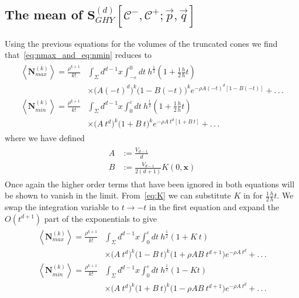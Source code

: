 \documentclass[12pt]{article}
\begin{document}
\subsection{The mean of $\textbf{S}^{ (d)}_{GHY}[\mathcal {C}^-,\mathcal{C}^+;\vec{p},\vec{q}]$}

Using the previous equations for the volumes of the truncated cones we find that~\eqref{eq:nmax_and_eq:nmin} reduces to
\begin{gather}\label{eq:nmax_and_eq:nmin_volume_expanded}
\begin{aligned}
\left\langle \textbf{N}_{max}^{ (k)}\right\rangle = \frac{\rho^{k+1}}{k!} & \int_{\Sigma}d^{d-1}x\int_{-\varepsilon}^{0}dt\:
h^{\frac{1}{2}}\left (1+
\frac{1}{2}\frac{\dot{h}}{h}t\right)
 \\
 & \times \Big ( A (-t)^d \Big)^k 
 \Big ( 1 - B (-t) \Big)^k
 e^{-\rho A (-t)^d \left[1-B (-t) \right]} + .\,.\,.
\\
\left\langle \textbf{N}_{min}^{ (k)}\right\rangle = \frac{\rho^{k+1}}{k!} & \int_{\Sigma}d^{d-1}x\int_{0}^{\varepsilon}dt\:
h^{\frac{1}{2}}\left (1+
\frac{1}{2}\frac{\dot{h}}{h}t\right)
 \\
 & \times \Big ( A\: t^d \Big)^k 
 \Big ( 1 + B\: t \Big)^k
 e^{-\rho A\: t^d \left[1+B\: t \right]} + .\,.\,.
\end{aligned}
\end{gather}
where we have defined
\begin{gather}\label{A_and_B_defn}
\begin{aligned}
A & := \frac{V_{d-1}}{d} \\
B & := \frac{V_{d-1}}{2 (d+1)}K (0,\mathbf{x})
\end{aligned}
\end{gather}
Once again the higher order terms that have been ignored in both equations will be shown to vanish in the limit. From~\eqref{eq:K} we can substitute $K$ in for $\frac{1}{2}\frac{\dot{h}}{h}t$. We swap the integration variable to $t\rightarrow -t$ in the first equation and expand the $O (t^{d+1})$ part of the exponentials to give
\begin{gather}\label{eq:nmax_and_eq:nmin_volume_expo_expanded}
\begin{aligned}
\left\langle \textbf{N}_{max}^{ (k)}\right\rangle = \frac{\rho^{k+1}}{k!} & \int_{\Sigma}d^{d-1}x\int_{0}^{\varepsilon}dt\:
h^{\frac{1}{2}}\left (1+
K\: t\right)
 \\
 & \times \Big ( A\: t^d \Big)^k 
 \Big ( 1 - B\: t \Big)^k
 \Big ( 1 + \rho A B\: t^{d+1} \Big)
 e^{-\rho A\: t^d} + .\,.\,.
\\
\left\langle \textbf{N}_{min}^{ (k)}\right\rangle = \frac{\rho^{k+1}}{k!} & \int_{\Sigma}d^{d-1}x\int_{0}^{\varepsilon}dt\:
h^{\frac{1}{2}}\left (1-
Kt\right)
 \\
 & \times \Big ( A\: t^d \Big)^k 
 \Big ( 1 + B\: t \Big)^k
  \Big ( 1 - \rho A B\: t^{d+1} \Big)
 e^{-\rho A\: t^d} + .\,.\,.
\end{aligned}
\end{gather}
\end{document}
